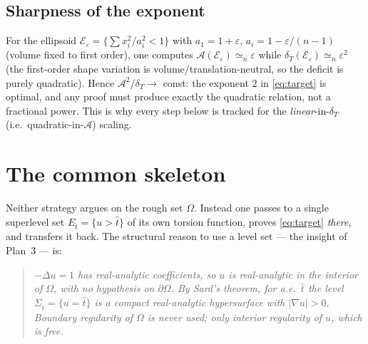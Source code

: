 \documentclass[11pt]{amsart}
\theoremstyle{definition}
\theoremstyle{remark}
\newcommand{\Om}{\Omega}
\newcommand{\Et}{E_{\hat t}}
\newcommand{\St}{\Sigma_{\hat t}}
\newcommand{\dT}{\delta_T}
\newcommand{\Asym}{\mathcal A}
\begin{document}
\subsection*{Sharpness of the exponent}
For the ellipsoid $\mathcal E_\varepsilon=\{\sum x_i^2/a_i^2<1\}$ with
$a_1=1+\varepsilon$, $a_i=1-\varepsilon/(n-1)$ (volume fixed to first order),
one computes $\Asym(\mathcal E_\varepsilon)\simeq_n\varepsilon$ while
$\dT(\mathcal E_\varepsilon)\simeq_n\varepsilon^2$ (the first-order shape
variation is volume/translation-neutral, so the deficit is purely quadratic).
Hence $\Asym^2/\dT\to$ const: the exponent $2$ in \eqref{eq:target} is
optimal, and any proof must produce exactly the quadratic relation, not a
fractional power. This is why every step below is tracked for the
\emph{linear}-in-$\dT$ (i.e.\ quadratic-in-$\Asym$) scaling.

\section{The common skeleton}

Neither strategy argues on the rough set $\Om$. Instead one passes to a single
superlevel set $\Et=\{u>\hat t\}$ of its own torsion function, proves
\eqref{eq:target} \emph{there}, and transfers it back. The structural reason
to use a level set --- the insight of Plan~3 --- is:

\begin{quote}\itshape
$-\Delta u=1$ has real-analytic coefficients, so $u$ is real-analytic in the
interior of $\Om$, with \emph{no hypothesis on $\partial\Om$}. By Sard's
theorem, for a.e.\ $\hat t$ the level $\St=\{u=\hat t\}$ is a compact
real-analytic hypersurface with $|\nabla u|>0$. Boundary regularity of $\Om$
is never used; only interior regularity of $u$, which is free.
\end{quote}
\end{document}

